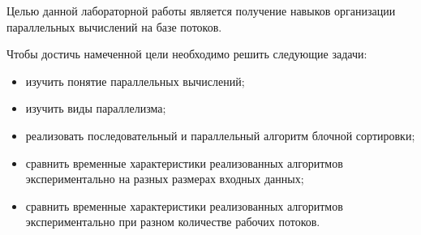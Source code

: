 Целью данной лабораторной работы является получение навыков организации параллельных вычислений на базе потоков.

Чтобы достичь намеченной цели необходимо решить следующие задачи: 

\begin{itemize}
	\item изучить понятие параллельных вычислений;
	\item изучить виды параллелизма;
	\item реализовать последовательный и параллельный алгоритм блочной сортировки;
	\item сравнить временные характеристики реализованных алгоритмов экспериментально на разных размерах входных данных;
	\item сравнить временные характеристики реализованных алгоритмов экспериментально при разном количестве рабочих потоков.
\end{itemize}

